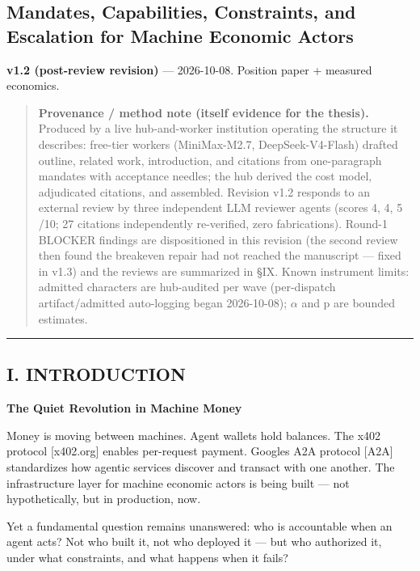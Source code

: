 \documentclass[
]{article}
\begin{document}
\subsection{Mandates, Capabilities, Constraints, and Escalation for
Machine Economic
Actors}\label{mandates-capabilities-constraints-and-escalation-for-machine-economic-actors}

\textbf{v1.2 (post-review revision)} --- 2026-10-08. Position paper +
measured economics.

\begin{quote}
\textbf{Provenance / method note (itself evidence for the thesis).}
Produced by a live hub-and-worker institution operating the structure it
describes: free-tier workers (MiniMax-M2.7, DeepSeek-V4-Flash) drafted
outline, related work, introduction, and citations from one-paragraph
mandates with acceptance needles; the hub derived the cost model,
adjudicated citations, and assembled. Revision v1.2 responds to an
external review by three independent LLM reviewer agents (scores 4, 4, 5
/10; 27 citations independently re-verified, zero fabrications). Round-1
BLOCKER findings are dispositioned in this revision (the second review
then found the breakeven repair had not reached the manuscript --- fixed
in v1.3) and the reviews are summarized in \S{}IX. Known instrument limits:
admitted characters are hub-audited per wave (per-dispatch
artifact/admitted auto-logging began 2026-10-08); $\alpha$ and p are bounded
estimates.
\end{quote}

\begin{center}\rule{0.5\linewidth}{0.5pt}\end{center}

\subsection{I. INTRODUCTION}\label{i-introduction}

\textbf{The Quiet Revolution in Machine Money}

Money is moving between machines. Agent wallets hold balances. The x402
protocol {[}x402.org{]} enables per-request payment.
Google\textquotesingle s A2A protocol {[}A2A{]} standardizes how agentic
services discover and transact with one another. The infrastructure
layer for machine economic actors is being built --- not hypothetically,
but in production, now.

Yet a fundamental question remains unanswered: who is accountable when
an agent acts? Not who built it, not who deployed it --- but who
authorized it, under what constraints, and what happens when it fails?
\end{document}
